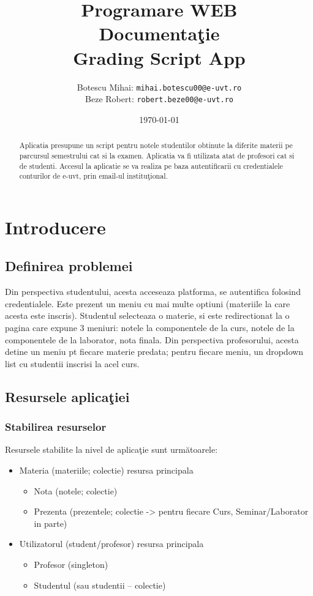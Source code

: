 \documentclass{report}
\title{Programare WEB \\ Documenta\c tie \\ Grading Script App}
\author{Botescu Mihai: \texttt{mihai.botescu00@e-uvt.ro} \\ Beze Robert: \texttt{robert.beze00@e-uvt.ro}}
\date{\today}
\begin{document}
\maketitle
\begin{abstract}
    Aplicatia presupune un script pentru notele studentilor obtinute la diferite materii pe parcursul semestrului cat si la examen. 
Aplicatia va fi utilizata atat de profesori cat si de studenti. Accesul la aplicatie se va realiza pe baza autentificarii cu credentialele conturilor de e-uvt, prin email-ul institu\c tional. 
\end{abstract}
\tableofcontents
\chapter{Introducere}
\section{Definirea problemei}
Din perspectiva studentului, acesta acceseaza platforma, se autentifica folosind credentialele. Este prezent un meniu cu mai multe optiuni (materiile la care acesta este inscris). Studentul  selecteaza o materie, si este redirectionat la o pagina care expune 3 meniuri: notele la componentele de la curs, notele de la componentele de la laborator, nota finala.
Din perspectiva profesorului, acesta detine un meniu pt fiecare materie predata; pentru fiecare meniu, un dropdown list cu studentii inscrisi la acel curs.
 
\section{Resursele aplica\c tiei}

\subsection{Stabilirea resurselor}
Resursele \cite{Masse2011} stabilite la nivel de aplica\c tie sunt urm\u atoarele:

\begin{itemize}\item Materia (materiile; colectie) resursa principala  \begin{itemize} 
\item Nota (notele; colectie) 
\item Prezenta (prezentele; colectie -> pentru fiecare Curs, Seminar/Laborator in parte) 
\end{itemize} \item Utilizatorul (student/profesor) resursa principala \begin{itemize}
\item Profesor (singleton) 
\item Studentul (sau studentii – colectie) 
\end{itemize}
\end{itemize}
\end{document}
